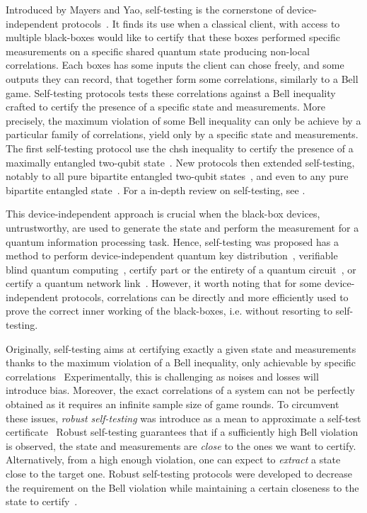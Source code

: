 Introduced by Mayers and Yao, self-testing is the cornerstone of device-independent protocols~\cite{Mayers2004}.
It finds its use when a classical client, with access to multiple black-boxes would like to certify that these boxes performed specific measurements on a specific shared quantum state producing non-local correlations.
Each boxes has some inputs the client can chose freely, and some outputs they can record, that together form some correlations, similarly to a Bell game.
Self-testing protocols tests these correlations against a Bell inequality crafted to certify the presence of a specific state and measurements.
More precisely, the maximum violation of some Bell inequality can only be achieve by a particular family of correlations, yield only by a specific state and measurements.
The first self-testing protocol use the \acrshort{chsh} inequality to certify the presence of a maximally entangled two-qubit state~\cite{Mayers2004}. 
New protocols then extended self-testing, notably to all pure bipartite entangled two-qubit states~\cite{Yang2013,Bamps2015}, and even to any pure bipartite entangled state~\cite{Coladangelo2017}. 
For a in-depth review on self-testing, see \cite{Supic2019}.

\medbreak

This device-independent approach is crucial when the black-box devices, untrustworthy, are used to generate the state and perform the measurement for a quantum information processing task.
Hence, self-testing was proposed has a method to perform device-independent quantum key distribution~\cite{Mayers2004}, verifiable blind quantum computing~\cite{Gheorghiu2015,Gheorghiu2017}, certify part or the entirety of a quantum circuit~\cite{Magniez2006,Sekatski2018}, or certify a quantum network link~\cite{Bancal2021}.
However, it worth noting that for some device-independent protocols, correlations can be directly and more efficiently used to prove the correct inner working of the black-boxes, i.e. without resorting to self-testing.

\medbreak

Originally, self-testing aims at certifying exactly a given state and measurements thanks to the maximum violation of a Bell inequality, only achievable by specific correlations~\cite{Mayers2004}
Experimentally, this is challenging as noises and losses will introduce bias.
Moreover, the exact correlations of a system can not be perfectly obtained as it requires an infinite sample size of game rounds.
To circumvent these issues, \textit{robust self-testing} was introduce as a mean to approximate a self-test certificate~\cite{Kaniewski2016}
Robust self-testing guarantees that if a sufficiently high Bell violation is observed, the state and measurements are \textit{close} to the ones we want to certify.
Alternatively, from a high enough violation, one can expect to \textit{extract} a state close to the target one.
Robust self-testing protocols were developed to decrease the requirement on the Bell violation while maintaining a certain closeness to the state to certify~\cite{Bancal2015,Kaniewski2016,Kaniewski2017,Valcarce2022}.
